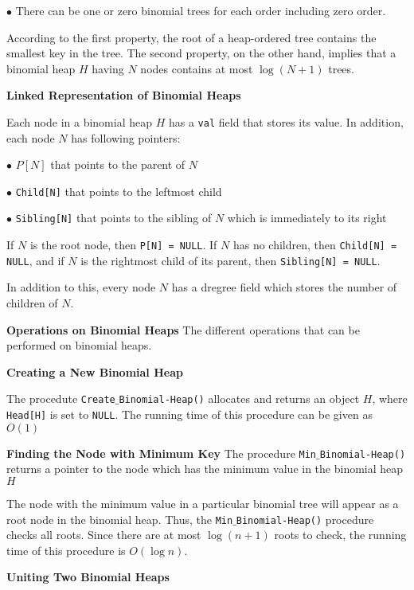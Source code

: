 \vskip 3mm
\qquad$\bullet$ There can be one or zero binomial trees for each order including zero order.

\vskip 1mm
According to the first property, the root of a heap-ordered tree contains the smallest key in the tree. The second property, on the other hand, implies that a binomial heap $H$ having $N$ nodes contains at most $\log(N+1)$ trees.

\filbreak
\vskip 1cm
{\bf Linked Representation of Binomial Heaps}

\vskip 1mm
Each node in a binomial heap $H$ has a {\tt val} field that stores its value. In addition, each node $N$ has following pointers:

\vskip 2mm
\qquad$\bullet$ $P[N]$ that points to the parent of $N$

\vskip 3mm
\qquad$\bullet$ {\tt Child[N]} that points to the leftmost child

\vskip 3mm
\qquad$\bullet$ {\tt Sibling[N]} that points to the sibling of $N$ which is immediately to its right

\vskip 1mm
If $N$ is the root node, then {\tt P[N] = NULL}. If $N$ has no children, then {\tt Child[N] = NULL}, and if $N$ is the rightmost child of its parent, then {\tt Sibling[N] = NULL}.

\vskip 1mm
In addition to this, every node $N$ has a dregree field which stores the number of children of $N$.

\filbreak
\vskip 1cm
{\bf Operations on Binomial Heaps}
\vskip 1mm
The different operations that can be performed on binomial heaps.

\vskip 3mm
{\bf Creating a New Binomial Heap}

\vskip 1mm
The procedute {\tt Create$\_$Binomial-Heap()} allocates and returns an object $H$, where {\tt Head[H]} is set to {\tt NULL}. The running time of this procedure can be given as $O(1)$

\vskip 3mm
{\bf Finding the Node with Minimum Key}
\vskip 1mm
The procedure {\tt Min$\_$Binomial-Heap()} returns a pointer to the node which has the minimum value in the binomial heap $H$

\vskip 1mm
The node with the minimum value in a particular binomial tree will appear as a root node in the binomial heap. Thus, the {\tt Min$\_$Binomial-Heap()} procedure checks all roots. Since there are at most $\log(n+1)$ roots to check, the running time of this procedure is $O(\log n)$.

\vskip 3mm
{\bf Uniting Two Binomial Heaps}

